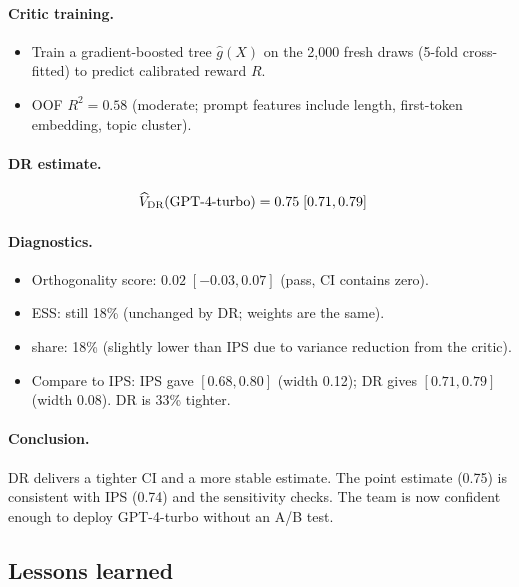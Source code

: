 \paragraph{Critic training.}
\begin{itemize}
\item Train a gradient-boosted tree $\hat{g}(X)$ on the 2,000 fresh draws (5-fold cross-fitted) to predict calibrated reward $R$.
\item OOF $R^2 = 0.58$ (moderate; prompt features include length, first-token embedding, topic cluster).
\end{itemize}

\paragraph{DR estimate.}
\begin{align*}
\widehat{V}_{\text{DR}}(\text{GPT-4-turbo}) &= 0.75 \; [0.71, 0.79]
\end{align*}

\paragraph{Diagnostics.}
\begin{itemize}
\item Orthogonality score: $0.02 \; [-0.03, 0.07]$ (pass, CI contains zero).
\item ESS: still 18\% (unchanged by DR; weights are the same).
\item \oua{} share: 18\% (slightly lower than IPS due to variance reduction from the critic).
\item Compare to IPS: IPS gave $[0.68, 0.80]$ (width 0.12); DR gives $[0.71, 0.79]$ (width 0.08). DR is 33\% tighter.
\end{itemize}

\paragraph{Conclusion.} DR delivers a tighter CI and a more stable estimate. The point estimate (0.75) is consistent with IPS (0.74) and the sensitivity checks. The team is now confident enough to deploy GPT-4-turbo without an A/B test.

\subsection{Lessons learned}

